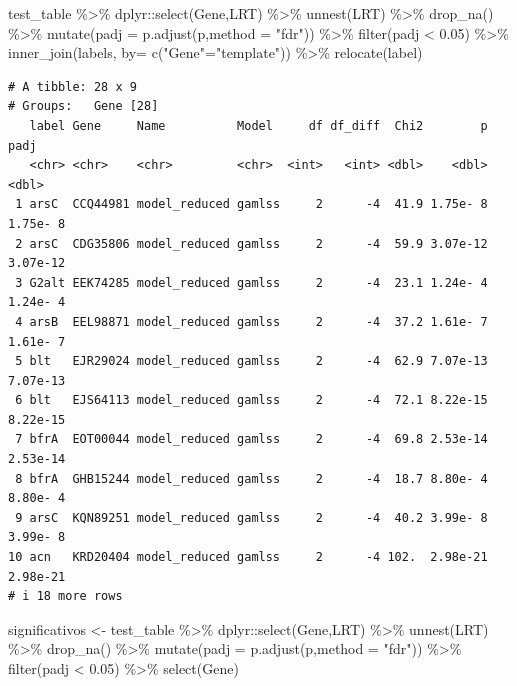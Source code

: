 \documentclass[
  letterpaper,
  DIV=11,
  numbers=noendperiod]{scrartcl}
\newenvironment{Shaded}{\begin{snugshade}}{\end{snugshade}}
\newcommand{\AttributeTok}[1]{\textcolor[rgb]{0.40,0.45,0.13}{#1}}
\newcommand{\FloatTok}[1]{\textcolor[rgb]{0.68,0.00,0.00}{#1}}
\newcommand{\FunctionTok}[1]{\textcolor[rgb]{0.28,0.35,0.67}{#1}}
\newcommand{\NormalTok}[1]{\textcolor[rgb]{0.00,0.23,0.31}{#1}}
\newcommand{\OtherTok}[1]{\textcolor[rgb]{0.00,0.23,0.31}{#1}}
\newcommand{\SpecialCharTok}[1]{\textcolor[rgb]{0.37,0.37,0.37}{#1}}
\newcommand{\StringTok}[1]{\textcolor[rgb]{0.13,0.47,0.30}{#1}}
\begin{document}
\begin{Shaded}
\begin{Highlighting}[]
\NormalTok{test\_table }\SpecialCharTok{\%\textgreater{}\%} 
\NormalTok{  dplyr}\SpecialCharTok{::}\FunctionTok{select}\NormalTok{(Gene,LRT) }\SpecialCharTok{\%\textgreater{}\%} 
  \FunctionTok{unnest}\NormalTok{(LRT) }\SpecialCharTok{\%\textgreater{}\%} 
  \FunctionTok{drop\_na}\NormalTok{() }\SpecialCharTok{\%\textgreater{}\%} 
  \FunctionTok{mutate}\NormalTok{(}\AttributeTok{padj =} \FunctionTok{p.adjust}\NormalTok{(p,}\AttributeTok{method =} \StringTok{"fdr"}\NormalTok{)) }\SpecialCharTok{\%\textgreater{}\%} 
  \FunctionTok{filter}\NormalTok{(padj }\SpecialCharTok{\textless{}} \FloatTok{0.05}\NormalTok{) }\SpecialCharTok{\%\textgreater{}\%} 
  \FunctionTok{inner\_join}\NormalTok{(labels, }\AttributeTok{by=} \FunctionTok{c}\NormalTok{(}\StringTok{"Gene"}\OtherTok{=}\StringTok{"template"}\NormalTok{)) }\SpecialCharTok{\%\textgreater{}\%} 
  \FunctionTok{relocate}\NormalTok{(label)}
\end{Highlighting}
\end{Shaded}

\begin{verbatim}
# A tibble: 28 x 9
# Groups:   Gene [28]
   label Gene     Name          Model     df df_diff  Chi2        p     padj
   <chr> <chr>    <chr>         <chr>  <int>   <int> <dbl>    <dbl>    <dbl>
 1 arsC  CCQ44981 model_reduced gamlss     2      -4  41.9 1.75e- 8 1.75e- 8
 2 arsC  CDG35806 model_reduced gamlss     2      -4  59.9 3.07e-12 3.07e-12
 3 G2alt EEK74285 model_reduced gamlss     2      -4  23.1 1.24e- 4 1.24e- 4
 4 arsB  EEL98871 model_reduced gamlss     2      -4  37.2 1.61e- 7 1.61e- 7
 5 blt   EJR29024 model_reduced gamlss     2      -4  62.9 7.07e-13 7.07e-13
 6 blt   EJS64113 model_reduced gamlss     2      -4  72.1 8.22e-15 8.22e-15
 7 bfrA  EOT00044 model_reduced gamlss     2      -4  69.8 2.53e-14 2.53e-14
 8 bfrA  GHB15244 model_reduced gamlss     2      -4  18.7 8.80e- 4 8.80e- 4
 9 arsC  KQN89251 model_reduced gamlss     2      -4  40.2 3.99e- 8 3.99e- 8
10 acn   KRD20404 model_reduced gamlss     2      -4 102.  2.98e-21 2.98e-21
# i 18 more rows
\end{verbatim}

\begin{Shaded}
\begin{Highlighting}[]
\NormalTok{significativos }\OtherTok{\textless{}{-}}\NormalTok{ test\_table }\SpecialCharTok{\%\textgreater{}\%} 
\NormalTok{  dplyr}\SpecialCharTok{::}\FunctionTok{select}\NormalTok{(Gene,LRT) }\SpecialCharTok{\%\textgreater{}\%} 
  \FunctionTok{unnest}\NormalTok{(LRT) }\SpecialCharTok{\%\textgreater{}\%} 
  \FunctionTok{drop\_na}\NormalTok{() }\SpecialCharTok{\%\textgreater{}\%} 
  \FunctionTok{mutate}\NormalTok{(}\AttributeTok{padj =} \FunctionTok{p.adjust}\NormalTok{(p,}\AttributeTok{method =} \StringTok{"fdr"}\NormalTok{)) }\SpecialCharTok{\%\textgreater{}\%} 
  \FunctionTok{filter}\NormalTok{(padj }\SpecialCharTok{\textless{}} \FloatTok{0.05}\NormalTok{) }\SpecialCharTok{\%\textgreater{}\%} 
  \FunctionTok{select}\NormalTok{(Gene)}
\end{Highlighting}
\end{Shaded}
\end{document}
